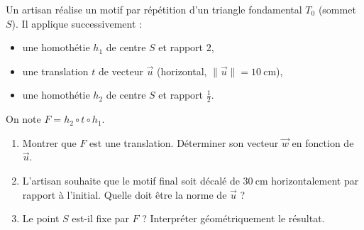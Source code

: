 \documentclass[11pt]{article}
\begin{document}
\begin{exercice}
Un artisan réalise un motif par répétition d'un triangle fondamental $T_0$ (sommet $S$). Il applique successivement :
\begin{itemize}
    \item une homothétie $h_1$ de centre $S$ et rapport $2$,
    \item une translation $t$ de vecteur $\vec{u}$ (horizontal, $\|\vec{u}\| = \SI{10}{\centi\meter}$),
    \item une homothétie $h_2$ de centre $S$ et rapport $\frac{1}{2}$.
\end{itemize}
On note $F = h_2 \circ t \circ h_1$.
\begin{enumerate}
    \item Montrer que $F$ est une translation. Déterminer son vecteur $\vec{w}$ en fonction de $\vec{u}$.
    \item L'artisan souhaite que le motif final soit décalé de $\SI{30}{\centi\meter}$ horizontalement par rapport à l'initial. Quelle doit être la norme de $\vec{u}$ ?
    \item Le point $S$ est-il fixe par $F$ ? Interpréter géométriquement le résultat.
\end{enumerate}
\end{exercice}
\end{document}
